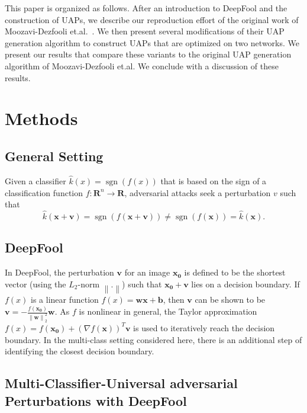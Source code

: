 \documentclass[runningheads]{llncs}
\DeclareMathOperator{\sgn}{sgn}
\newcommand{\xn}{\ensuremath{\mathbf{x_0}}}
\begin{document}
This paper is organized as follows. After an introduction to DeepFool and the construction of UAPs, we describe our reproduction effort of the original work of Moozavi-Dezfooli et.al.~\cite{moosavi-dezfooli_universal_2017}. We then present several modifications of their UAP generation algorithm to construct UAPs that are optimized on two networks. We present our results that compare these variants to the original UAP generation algorithm of Moozavi-Dezfooli et.al. We conclude with a discussion of these results.

\section{Methods}
\subsection{General Setting}
Given a classifier $\hat{k}(x)=\sgn\left(f(x)\right)$ that is based on the sign of a classification function $f:\mathbf{R}^n\rightarrow\mathbf{R}$, adversarial attacks seek a perturbation $v$ such that \[\hat{k}(\mathbf{x}+\mathbf{v})=\sgn\left(f(\mathbf{x}+\mathbf{v})\right)\neq \sgn\left(f(\mathbf{x})\right)=\hat{k}(\mathbf{x}).\] 


\subsection{DeepFool}
In DeepFool, the perturbation $\mathbf{v}$ for an image $\xn$ is defined to be the shortest vector (using the $L_2$-norm $\left\|.\right\|$) such that $\xn+\mathbf{v}$ lies on a decision boundary. 
If $f(x)$ is a linear function $f(x)=\mathbf{w} \mathbf{x}+\mathbf{b}$, then $\mathbf{v}$ can be shown to be $\mathbf{v}=-\frac{f(\xn)}{\left\|\mathbf{w}\right\|_2^2}\mathbf{w}$. As $f$ is nonlinear in general, the Taylor approximation $f(x)=f(\xn)+\left(\nabla f(\mathbf{x})\right)^T\mathbf{v}$ is used to iteratively reach the decision boundary. 
In the multi-class setting considered here, there is an additional step of identifying the closest decision boundary. 


\subsection{Multi-Classifier-Universal adversarial Perturbations with DeepFool}
\end{document}
